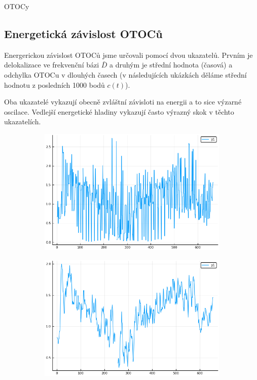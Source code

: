\documentclass{article}
\begin{document}
\begin{section}{OTOCy}
    \subsection{Energetická závislost OTOCů}

    Energerickou závislost OTOCů jsme určovali pomocí dvou ukazatelů. Prvním je delokalizace
    ve frekvenční bázi $\bar{D}$ a druhým je střední hodnota (časová) a odchylka OTOCu v dlouhých časech (v následujících
    ukázkách děláme střední hodnotu z posledních 1000 bodů $c(t)$).

    Oba ukazatelé vykazují obecně zvláštní závisloti na energii a to sice výzarné oscilace.
    Vedlejší energetické hladiny vykazují často výrazný skok v těchto ukazatelích.  

    \begin{figure}[H]
        \centering
        \begin{subfigure}{.5\textwidth}
          \centering
          \includegraphics[width=1.0\linewidth]{Escale0.png}

        \end{subfigure}%

        \begin{subfigure}{.5\textwidth}
          \centering
          \includegraphics[width=1.0\linewidth]{Escale0smooth.png}


\end{subfigure}
\end{figure}
\end{section}
\end{document}
